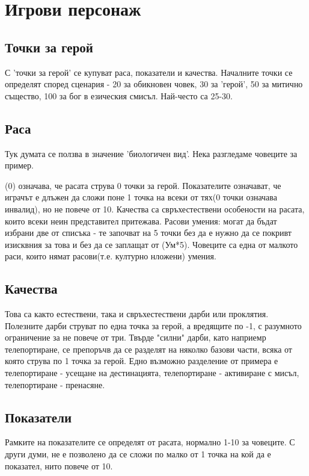 
\section{Игрови персонаж}

\subsection{Точки за герой}
С 'точки за герой' се купуват раса, показатели и качества.
Началните точки се определят според сценария - 20 за обикновен човек, 30 за 'герой', 50 за митично същество, 100 за бог в езическия смисъл.
Най-често са 25-30.

\subsection{Раса}
Тук думата се ползва в значение 'биологичен вид'.
Нека разгледаме човеците за пример.
\begin{multicols}{2}
(0) означава, че расата струва 0 точки за герой.
Показателите означават, че играчът е длъжен да сложи поне 1 точка на всеки от тях(0 точки означава инвалид), но не повече от 10.
Качества са свръхестествени особености на расата, които всеки неин представител притежава.
Расови умения: могат да бъдат избрани две от списъка - те започват на 5 точки без да е нужно да се покривт изисквния за това и без да се заплащат от (Ум*5).
Човеците са една от малкото раси, които нямат расови(т.е. културно нложени) умения.
\end{multicols}

\subsection{Качества}
Това са както естествени, така и свръхестествени дарби или проклятия.
Полезните дарби струват по една точка за герой, а вредящите по -1, с разумното ограничение за не повече от три.
Твърде "силни" дарби, като наприемр телепортиране, се препоръчв да се разделят на няколко базови части, всяка от която струва по 1 точка за герой.
Едно възможно разделение от примера е телепортиране - усещане на дестинацията, телепортиране - активиране с мисъл, телепортиране - пренасяне.

\subsection{Показатели}
Рамките на показателите се определят от расата, нормално 1-10 за човеците.
С други думи, не е позволено да се сложи по малко от 1 точка на кой да е показател, нито повече от 10.

